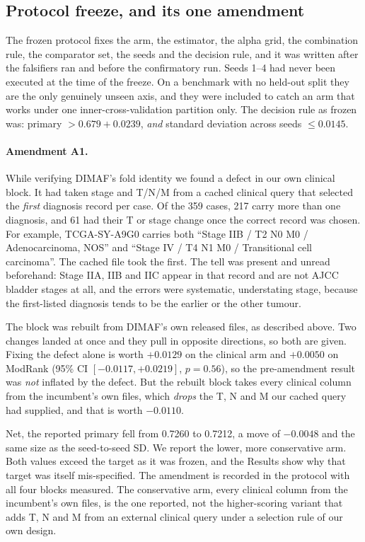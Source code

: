 \documentclass[unnumsec,webpdf,contemporary,large]{oup-authoring-template}
\begin{document}
\subsection{Protocol freeze, and its one amendment}

The frozen protocol fixes the arm, the estimator, the alpha
grid, the combination rule, the comparator set, the seeds and the decision rule, and it was written
after the falsifiers ran and before the confirmatory run. Seeds 1--4 had never been executed at the
time of the freeze. On a benchmark with no held-out split they are the only genuinely unseen axis,
and they were included to catch an arm that works under one inner-cross-validation partition only.
The decision rule as frozen was: primary $> 0.679 + 0.0239$, \emph{and} standard deviation across
seeds $\leq 0.0145$.

\paragraph{Amendment A1.} While verifying DIMAF's fold identity we found a defect in our own
clinical block. It had taken stage and T/N/M from a cached clinical query that selected the
\emph{first} diagnosis record per case. Of the 359 cases, 217 carry more than one diagnosis, and 61 had
their T or stage change once the correct record was chosen. For example, TCGA-SY-A9G0 carries both
``Stage IIB / T2 N0 M0 / Adenocarcinoma, NOS'' and ``Stage IV / T4 N1 M0 / Transitional cell
carcinoma''. The cached file took the first. The tell was present and unread beforehand: Stage IIA,
IIB and IIC appear in that record and are not AJCC bladder stages at all, and the errors were
systematic, understating stage, because the first-listed diagnosis tends to be the earlier or the
other tumour.

The block was rebuilt from DIMAF's own released files, as described above. Two changes landed at once and they pull in opposite directions, so both are given. Fixing the defect alone is worth
$+0.0129$ on the clinical arm and $+0.0050$ on ModRank (95\% CI $[-0.0117,+0.0219]$,
$p=0.56$), so the pre-amendment result was \emph{not} inflated by the defect. But the rebuilt
block takes every clinical column from the incumbent's own files, which \emph{drops} the T, N and M
our cached query had supplied, and that is worth $-0.0110$.

Net, the reported primary fell from 0.7260 to 0.7212, a move of $-0.0048$ and the same size
as the seed-to-seed SD. We report the lower, more conservative arm. Both values exceed the target
as it was frozen, and the Results show why that target was itself mis-specified. The amendment is recorded in the protocol with
all four blocks measured. The conservative arm, every clinical column from the incumbent's own
files, is the one reported, not the higher-scoring variant that adds T, N and M from an external
clinical query under a selection rule of our own design.
\end{document}
